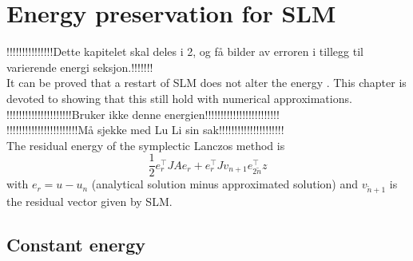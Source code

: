 \chapter{Energy preservation for SLM }
!!!!!!!!!!!!!!!Dette kapitelet skal deles i 2, og få bilder av erroren i tillegg til varierende energi seksjon.!!!!!!!\\
It can be proved that a restart of SLM does not alter the energy \cite{luli}. This chapter is devoted to showing that this still hold with numerical approximations. \\

!!!!!!!!!!!!!!!!!!!!!Bruker ikke denne energien!!!!!!!!!!!!!!!!!!!!!!!!\\
!!!!!!!!!!!!!!!!!!!!!!!Må sjekke med Lu Li sin sak!!!!!!!!!!!!!!!!!!!!!\\
The residual energy of the symplectic Lanczos method is
\begin{equation}
\frac{1}{2} e_r^{\top} J A e_r + e_r^\top J v_{n+1} e_{2\tilde{n}}^\top z
\end{equation}
with $ e_r = u-u_n $ (analytical solution minus approximated solution) and $v_{\tilde{n}+1}$ is the residual vector given by SLM. 

\section{Constant energy}




